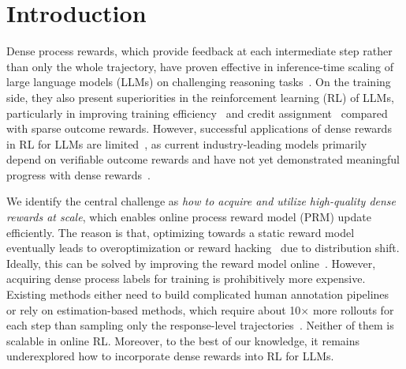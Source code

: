 
\section{Introduction}
Dense process rewards, which provide feedback at each intermediate step rather than only the whole trajectory, have proven effective in inference-time scaling of large language models (LLMs) on challenging reasoning tasks~\citep{uesato2022solving,Lightman2023LetsVS,Wang2023MathShepherdVA,yuan2024freeprocessrewardsprocess}.
On the training side, they also present superiorities in the reinforcement learning (RL) of LLMs, particularly in improving training efficiency~\citep{sutton2018reinforcement} and credit assignment~\citep{leike2018scalable} compared with sparse outcome rewards.
However, successful applications of dense rewards in RL for LLMs are limited~\citep{setlur2024rewarding}, as current industry-leading models primarily depend on verifiable outcome rewards and have not yet demonstrated meaningful progress with dense rewards~\citep{deepseekai2025deepseekr1incentivizingreasoningcapability,team2025kimi}.

We identify the central challenge as \textit{how to acquire and utilize high-quality dense rewards at scale}, which enables online process reward model (PRM) update efficiently.
The reason is that, optimizing towards a static reward model eventually leads to overoptimization or reward hacking~\citep{Gao2022ScalingLF} due to distribution shift. 
Ideally, this can be solved by improving the reward model online~\citep{leike2018scalable}. However, acquiring dense process labels for training is prohibitively more expensive. Existing methods either need to build complicated human annotation pipelines~\citep{Lightman2023LetsVS} or rely on estimation-based methods, which require about 10$\times$ more rollouts for each step than sampling only the response-level trajectories~\citep{Wang2023MathShepherdVA,kazemnejad2024vineppo}.
Neither of them is scalable in online RL. 
Moreover, to the best of our knowledge, it remains underexplored how to incorporate dense rewards into RL for LLMs. %

